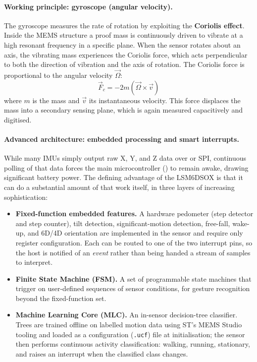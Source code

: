 \documentclass[12pt, a4paper]{article}
\begin{document}
\paragraph{Working principle: gyroscope (angular velocity).}
The gyroscope measures the rate of rotation by exploiting the \textbf{Coriolis
effect}. Inside the MEMS structure a proof mass is continuously driven to
vibrate at a high resonant frequency in a specific plane. When the sensor
rotates about an axis, the vibrating mass experiences the Coriolis force, which
acts perpendicular to both the direction of vibration and the axis of rotation.
The Coriolis force is proportional to the angular velocity $\vec{\Omega}$:
$$\vec{F}_c = -2m (\vec{\Omega} \times \vec{v})$$
where $m$ is the mass and $\vec{v}$ its instantaneous velocity. This force
displaces the mass into a secondary sensing plane, which is again measured
capacitively and digitised.

\paragraph{Advanced architecture: embedded processing and smart interrupts.}
While many IMUs simply output raw X, Y, and Z data over  or SPI,
continuous polling of that data forces the main microcontroller
() to remain awake, drawing significant battery power. The
defining advantage of the LSM6DSOX is that it can do a substantial amount of
that work itself, in three layers of increasing sophistication:

\begin{itemize}
  \item \textbf{Fixed-function embedded features.} A hardware pedometer (step
  detector and step counter), tilt detection, significant-motion detection,
  free-fall, wake-up, and 6D/4D orientation are implemented in the sensor and
  require only register configuration. Each can be routed to one of the two
  interrupt pins, so the host is notified of an \emph{event} rather than being
  handed a stream of samples to interpret.

  \item \textbf{Finite State Machine (FSM).} A set of programmable state
  machines that trigger on user-defined sequences of sensor conditions, for
  gesture recognition beyond the fixed-function set.

  \item \textbf{Machine Learning Core (MLC).} An in-sensor decision-tree
  classifier. Trees are trained offline on labelled motion data using ST's MEMS
  Studio tooling and loaded as a configuration (\texttt{.ucf}) file at
  initialisation; the sensor then performs continuous activity classification:
  walking, running, stationary, and raises an interrupt when the
  classified class changes.
\end{itemize}
\end{document}
